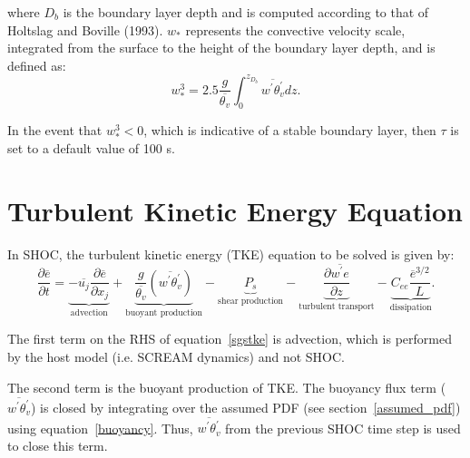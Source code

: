 \documentclass[12pt,titlepage]{article}
\numberwithin{equation}{section}
\begin{document}
where $D_{b}$ is the boundary layer depth and is computed according to that of Holtslag and Boville (1993).  $w_{*}$ represents the convective velocity scale, integrated from the surface to the height of the boundary layer depth, and is defined as:
%
\begin{equation}
  w_{*}^{3}=2.5\frac{g}{\overline{\theta_{v}}} \int_{0}^{z_{D_{b}}} \overline{w^{'}\theta_{v}^{'}} dz .   
  \label{wstar_pbl}
\end{equation}

In the event that $w_{*}^{3} < 0$, which is indicative of a stable boundary layer, then $\tau$ is set to a default value of 100 s.  

\section{Turbulent Kinetic Energy Equation}
\label{tke_equation}

In SHOC, the turbulent kinetic energy (TKE) equation to be solved is given by:
%
\begin{equation}
  \frac{\partial{\overline{e}}}{\partial{t}}=\underbrace{-\overline{u_{j}}\frac{\partial{\overline{e}}}{\partial{x_{j}}}}_\text{advection}+\underbrace{\frac{g}{\overline{\theta_{v}}}\left(\overline{w^{'}\theta_{v}^{'}}\right)}_\text{buoyant production}-\underbrace{P_{s}}_\text{shear production}-\underbrace{\frac{\partial{\overline{w^{'}e}}}{\partial{z}}}_\text{turbulent transport}-\underbrace{C_{ee}\frac{\overline{e}^{3/2}}{L}}_\text{dissipation} .  
  \label{sgstke}
\end{equation}

The first term on the RHS of equation~\ref{sgstke} is advection, which is performed by the host model (i.e. SCREAM dynamics) and not SHOC.  

The second term is the buoyant production of TKE.  The buoyancy flux term ($\overline{w^{'}\theta_{v}^{'}}$) is closed by integrating over the assumed PDF (see section~\ref{assumed_pdf}) using equation~\ref{buoyancy}.  Thus, $\overline{w^{'}\theta_{v}^{'}}$ from the previous SHOC time step is used to close this term.  
\end{document}
